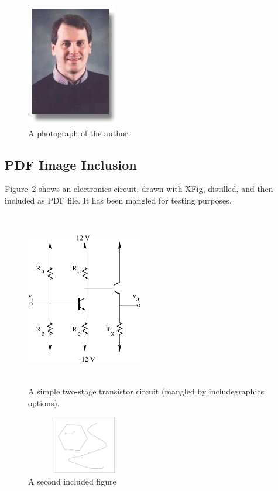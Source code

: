 \documentclass{article}
\begin{document}
\begin{figure}
  \begin{center}
    \includegraphics{mwicks.jpeg}
  \end{center}

  \caption{A photograph of the author.}
  \label{fig:author}
\end{figure}

\subsection{PDF Image Inclusion}
Figure~\ref{fig:circuit} shows
an electronics circuit,
drawn with XFig, distilled,
and then included as PDF file.
It has been mangled for testing purposes.
\begin{figure}
  \begin{center}
     \includegraphics[viewport=30 30 150 150,angle=20,width=2.0in,height=3.0in]{transistor}
  \end{center}

  \caption{A simple two-stage transistor circuit (mangled by includegraphics
options).}
  \label{fig:circuit}
\end{figure}

\begin{figure}
  \begin{center}
    \includegraphics[angle=20,height=1.0in,width=2.0in]{something.eps}
  \end{center}

  \caption{A second included figure}
  \label{fig:something}
\end{figure}
\end{document}
